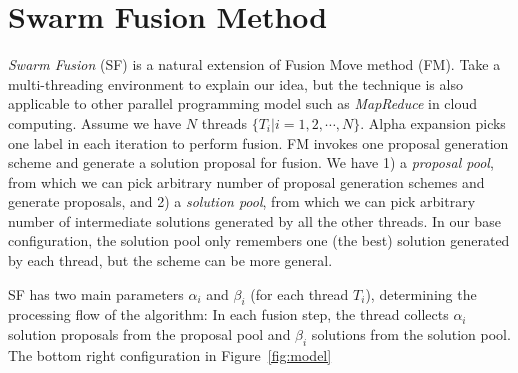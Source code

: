 \section{Swarm Fusion Method}
{\it Swarm Fusion} (SF) is a natural extension of Fusion Move method
(FM). Take a multi-threading environment to explain our idea, but the
technique is also applicable to other parallel programming model such as
{\it MapReduce} in cloud computing.
%
Assume we have $N$ threads $\{T_i | i=1, 2, \cdots, N\}$.  Alpha
expansion picks one label in each iteration to perform fusion. FM
invokes one proposal generation scheme and generate a solution proposal
for fusion. We have 1) a {\it proposal pool}, from which we can pick
arbitrary number of proposal generation schemes and generate proposals,
and 2) a {\it solution pool}, from which we can pick arbitrary number of
intermediate solutions generated by all the other threads.
%
%
In our base configuration, the solution pool only remembers one (the
best) solution generated by each thread, but the scheme can be more
general.

SF has two main parameters $\alpha_i$ and $\beta_i$ (for each thread
$T_i$), determining the processing flow of the algorithm: In each fusion
step, the thread collects $\alpha_i$ solution proposals from the
proposal pool and $\beta_i$ solutions from the solution pool.
The bottom right configuration in Figure~\ref{fig:model}



